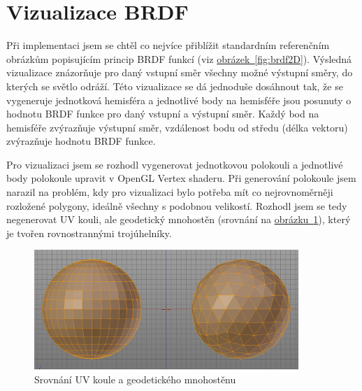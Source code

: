 \documentclass[czech,master]{diploma}
\begin{document}
\section{Vizualizace BRDF}
Při implementaci jsem se chtěl co nejvíce přiblížit standardním referenčním obrázkům popisujícím princip BRDF funkcí (viz \hyperref[fig:brdf2D]{obrázek~\ref{fig:brdf2D}}). Výsledná vizualizace znázorňuje  pro daný vstupní směr všechny možné výstupní směry, do kterých se světlo odráží. Této vizualizace se dá jednoduše dosáhnout tak, že se vygeneruje jednotková hemisféra a jednotlivé body na hemisféře jsou posunuty o hodnotu BRDF funkce pro daný vstupní a výstupní směr. Každý bod na hemisféře zvýrazňuje výstupní směr, vzdálenost bodu od středu (délka vektoru) zvýrazňuje hodnotu BRDF funkce.\par
Pro vizualizaci jsem se rozhodl vygenerovat jednotkovou polokouli a jednotlivé body polokoule upravit v OpenGL Vertex shaderu. Při generování polokoule jsem narazil na problém, kdy pro vizualizaci bylo potřeba mít co nejrovnoměrněji rozložené polygony, ideálně všechny s podobnou velikostí. Rozhodl jsem se tedy negenerovat UV kouli, ale geodetický mnohostěn (srovnání na \hyperref[fig:spheresComparison]{obrázku~\ref{fig:spheresComparison}}), který je tvořen rovnostrannými trojúhelníky.\par

\begin{figure}[ht]
  \centering
  \includegraphics[width=10cm]{Figures/IcosphereUVSphereComparison.png}
  \caption{Srovnání UV koule a geodetického mnohostěnu~\cite{tan_2019}}
  \label{fig:spheresComparison}
\end{figure}
\end{document}
